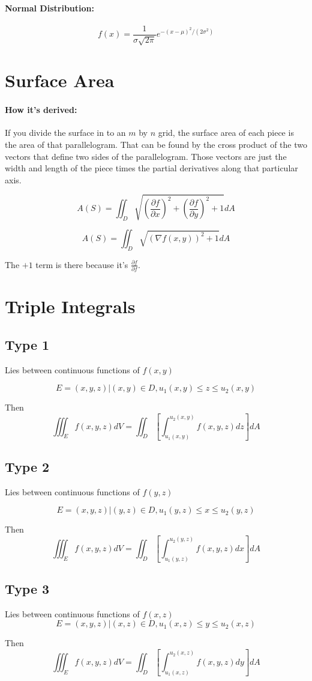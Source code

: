 \documentclass[a4paper,12pt]{report}
\begin{document}
\paragraph{Normal Distribution: } $$f(x) = \frac{1}{\sigma \sqrt{2\pi}} e^{-(x-\mu )^2/(2\sigma^2)}$$

\section{Surface Area}

\paragraph{How it's derived: } If you divide the surface in to an $m$ by $n$ grid, the 
surface area of each piece is the area of that parallelogram. That can be found by 
the cross product of the two vectors that define two sides of the parallelogram. Those 
vectors are just the width and length of the piece times the partial derivatives along 
that particular axis. 

$$A(S) = \iint_D \sqrt{(\frac{\partial f}{\partial x})^2 
                     + (\frac{\partial f}{\partial y})^2 + 1} dA$$

$$A(S) = \iint_D \sqrt{(\nabla f(x, y))^2 + 1} dA$$

The $+ 1$ term is there because it's $\frac{\partial f}{\partial f}$.

\section{Triple Integrals}
\subsection{Type 1}
Lies between continuous functions of $f(x, y)$

$$E = {(x, y, z) | (x, y) \in D, u_1(x, y) \leq z \leq u_2(x, y) }$$

Then $$\iiint_E f(x, y, z) dV = \iint_D [\int_{u_1(x, y)}^{u_2(x, y)} f(x, y, z) dz] dA$$

\subsection{Type 2}
Lies between continuous functions of $f(y, z)$

$$E = {(x, y, z) | (y, z) \in D, u_1(y, z) \leq x \leq u_2(y, z) }$$

Then $$\iiint_E f(x, y, z) dV = \iint_D [\int_{u_1(y, z)}^{u_2(y, z)} f(x, y, z) dx] dA$$


\subsection{Type 3}
Lies between continuous functions of $f(x, z)$
$$E = {(x, y, z) | (x, z) \in D, u_1(x, z) \leq y \leq u_2(x, z) }$$

Then $$\iiint_E f(x, y, z) dV = \iint_D [\int_{u_1(x, z)}^{u_2(x, z)} f(x, y, z) dy] dA$$
\end{document}
